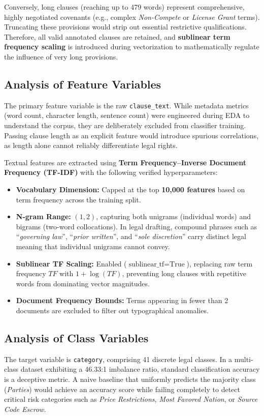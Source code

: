 Conversely, long clauses (reaching up to 479 words) represent comprehensive, highly negotiated covenants (e.g., complex \textit{Non-Compete} or \textit{License Grant} terms). Truncating these provisions would strip out essential restrictive qualifications. Therefore, all valid annotated clauses are retained, and \textbf{sublinear term frequency scaling} is introduced during vectorization to mathematically regulate the influence of very long provisions.

\subsection{Analysis of Feature Variables}
\label{subsec:feature_variables}
The primary feature variable is the raw \texttt{clause\_text}. While metadata metrics (word count, character length, sentence count) were engineered during EDA to understand the corpus, they are deliberately excluded from classifier training. Passing clause length as an explicit feature would introduce spurious correlations, as length alone cannot reliably differentiate legal rights.

Textual features are extracted using \textbf{Term Frequency--Inverse Document Frequency (TF-IDF)} with the following verified hyperparameters:
\begin{itemize}
    \item \textbf{Vocabulary Dimension:} Capped at the top \textbf{10,000 features} based on term frequency across the training split.
    \item \textbf{N-gram Range:} $(1, 2)$, capturing both unigrams (individual words) and bigrams (two-word collocations). In legal drafting, compound phrases such as ``\textit{governing law}'', ``\textit{prior written}'', and ``\textit{sole discretion}'' carry distinct legal meaning that individual unigrams cannot convey.
    \item \textbf{Sublinear TF Scaling:} Enabled ($\text{sublinear\_tf} = \text{True}$), replacing raw term frequency $TF$ with $1 + \log(TF)$, preventing long clauses with repetitive words from dominating vector magnitudes.
    \item \textbf{Document Frequency Bounds:} Terms appearing in fewer than 2 documents are excluded to filter out typographical anomalies.
\end{itemize}

\subsection{Analysis of Class Variables}
\label{subsec:class_variables}
The target variable is \texttt{category}, comprising 41 discrete legal classes. In a multi-class dataset exhibiting a 46.33:1 imbalance ratio, standard classification accuracy is a deceptive metric. A naive baseline that uniformly predicts the majority class (\textit{Parties}) would achieve an accuracy score while failing completely to detect critical risk categories such as \textit{Price Restrictions}, \textit{Most Favored Nation}, or \textit{Source Code Escrow}.

